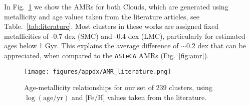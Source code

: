 \documentclass{aa}
\begin{document}
\begin{appendix}



In Fig.~\ref{fig:amr_lit} we show the AMRs for both Clouds, which are generated using
metallicity and age values taken from the literature articles, see
Table.~\ref{tab:literature}.
Most clusters in these works are assigned fixed metallicities of -0.7 dex (SMC)
and -0.4 dex (LMC), particularly for estimated ages below 1 Gyr. This explains
the average difference of ${\sim}0.2$ dex that can be appreciated, when compared
to the \texttt{ASteCA} AMRs (Fig.~\ref{fig:amr}).

\begin{figure}
\centering
\texttt{[image: figures/appdx/AMR\_literature.png]}
\caption{Age-metallicity relationships for our set of 239 clusters, using
$\log\mathrm{(age/yr)}$ and [Fe/H] values taken from the literature.}
\label{fig:amr_lit}
\end{figure}

\end{appendix} 
\end{document}
